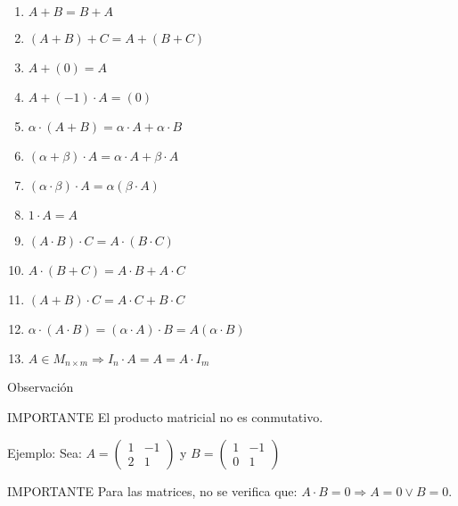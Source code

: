 \begin{enumerate}
\item
$A + B = B +A$

\item
$   (A + B)+C = A +(B +C) $

\item
$ A + (0) = A  $

\item
$  A +(-1)\cdot A =  (0)    $

\item
$\alpha \cdot(A + B) = \alpha \cdot A + \alpha \cdot B   $
 
\item
$ (\alpha+  \beta) \cdot A = \alpha \cdot A + \beta \cdot A  $

\item
$ (\alpha \cdot  \beta) \cdot A = \alpha ( \beta \cdot A )   $

\item
$ 1 \cdot A = A  $

\item
$  (A \cdot B) \cdot C = A \cdot (B \cdot C)  $

\item
$ A\cdot  (B +C) = A\cdot B +A\cdot C  $

\item
$ (A + B) \cdot  C = A\cdot C + B \cdot C  $

\item
$\alpha \cdot (A \cdot B) = (\alpha \cdot A)\cdot  B = A( \alpha \cdot B)  $

\item
$ A \in M_{n\times m} \Rightarrow I_n \cdot A = A = A \cdot I_m  $

\end{enumerate}


{Observación }

\begin{alertblock}{IMPORTANTE}
El producto matricial no  es conmutativo.
\end{alertblock}


Ejemplo:
Sea:
$A= \left(
\begin{array}{ccc}
1  & -1 \\
2  &   1
\end{array}
\right)
$
y
$B= \left(
\begin{array}{ccc}
1  & -1 \\
0  &   1
\end{array}
\right)
$


\begin{alertblock}{IMPORTANTE}
Para las matrices, no se verifica que: $A \cdot B =  0
 \Rightarrow A=0 \vee  B=0$.
\end{alertblock}


